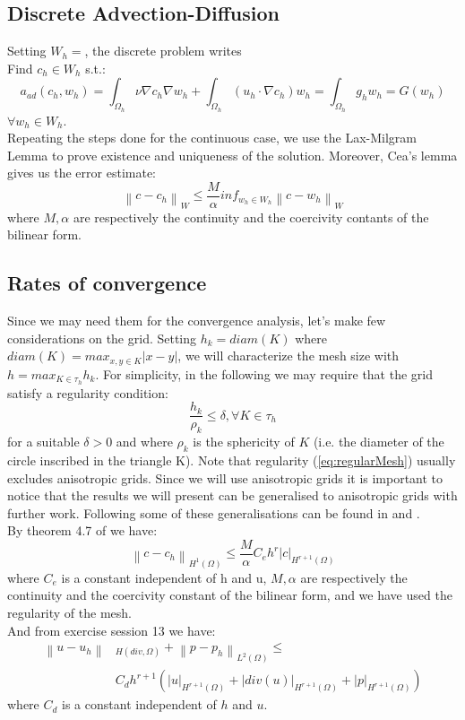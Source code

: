 \documentclass[conference]{IEEEtran}
\newcommand{\norm}[1]{\left\lVert#1\right\rVert}
\begin{document}
\subsection{Discrete Advection-Diffusion}
Setting $W_h=$, the discrete problem writes\\
Find $c_h \in W_h$ s.t.:
\begin{equation}
	  a_{ad}(c_h,w_h) = \int_{\Omega_h} \nu \nabla c_h \nabla w_h
      + \int_{\Omega_h} (u_h \cdot \nabla c_h) w_h
      = \int_{\Omega_h} g_h w_h = G(w_h)   	
\end{equation}
$\forall w_h \in W_h$.\\
Repeating the steps done for the continuous case, we use the Lax-Milgram Lemma to prove existence and uniqueness of the solution. Moreover, Cea's lemma gives us the error estimate:\\
$$ \norm{c-c_h}_W \leq \frac{M}{\alpha} inf_{w_h \in W_h} \norm{c-w_h}_W $$
where $M,\alpha$ are respectively the continuity and the coercivity contants of the bilinear form.

\subsection{Rates of convergence}
Since we may need them for the convergence analysis, let's make few considerations on the grid. Setting $h_k=diam(K)$ where $diam(K)=max_{x,y\in K}|x-y|$, we will characterize the mesh size with $h=max_{K\in \tau_h} h_k$. For simplicity, in the following we may require that the grid satisfy a regularity condition:
\begin{equation}
	\frac{h_k}{\rho_k} \leq \delta , \forall K \in \tau_h
	\label{eq:regularMesh}
\end{equation}
for a suitable $\delta > 0$ and where $\rho_k$ is the sphericity of $K$ (i.e. the diameter of the circle inscribed in the triangle K). Note that regularity (\ref{eq:regularMesh}) usually excludes anisotropic grids. Since we will use anisotropic grids it is important to notice that the results we will present can be generalised to anisotropic grids with further work. Following \cite{Perotto} some of these generalisations can be found in \cite{anisotropic} and \cite{anisotropic2}.\\

By theorem 4.7 of \cite{Perotto} we have:
$$ \norm{c-c_h}_{H^1(\Omega)} \leq \frac{M}{\alpha} C_e h^r |c|_{H^{r+1}(\Omega)} $$
where $C_e$ is a constant independent of h and u, $M,\alpha$ are respectively the continuity and the coercivity constant of the bilinear form, and we have used the regularity of the mesh. \\
And from exercise session 13 we have:
\begin{align*}
	\norm{u-u_h}&_{H(div,\Omega)} + \norm{p-p_h}_{L^2(\Omega)} \leq  \\
	&C_d h^{r+1}
(|u|_{H^{r+1}(\Omega)}+|div(u)|_{H^{r+1}(\Omega)}+|p|_{H^{r+1}(\Omega)})
\end{align*}
where $C_d$ is a constant independent of $h$ and $u$.\\  
\end{document}
